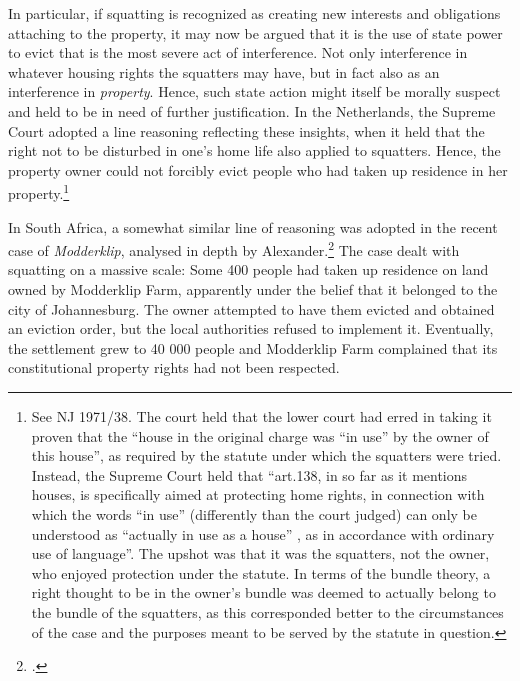In particular, if squatting is recognized as creating new interests and obligations attaching to the property, it may now be argued that  it is the use of state power to evict that is the most severe act of interference. Not only interference in whatever housing rights the squatters may have, but in fact also as an interference in {\it property}. Hence, such state action might itself be morally suspect and held to be in need of further justification. In the Netherlands, the Supreme Court adopted a line reasoning reflecting these insights, when it held that the right not to be disturbed in one's home life also applied to squatters. Hence, the property owner could not forcibly evict people who had taken up residence in her property.\footnote{See NJ 1971/38. The court held that the lower court had erred in taking it proven that the ``house in the original charge was ``in use'' by the owner of this house'', as required by the statute under which the squatters were tried. Instead, the Supreme Court held that ``art.138, in so far as it mentions houses, is specifically aimed at protecting home rights, in connection with which the words ``in use'' (differently than the court judged) can only be understood as ``actually in use as a house'' , as in accordance with ordinary use of language''. The upshot was that it was the squatters, not the owner, who enjoyed protection under the statute. In terms of the bundle theory, a right thought to be in the owner's bundle was deemed to actually belong to the bundle of the squatters, as this corresponded better to the circumstances of the case and the purposes meant to be served by the statute in question.}

In South Africa, a somewhat similar line of reasoning was adopted in the recent case of {\it Modderklip}, analysed in depth by Alexander.\footcite{....} The case dealt with squatting on a massive scale: Some 400 people had taken up residence on land owned by Modderklip Farm, apparently under the belief that it belonged to the city of Johannesburg. The owner attempted to have them evicted and obtained an eviction order, but the local authorities refused to implement it. Eventually, the settlement grew to 40 000 people and Modderklip Farm complained that its constitutional property rights had not been respected.

